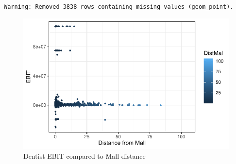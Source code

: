 \documentclass[
  10,
  a4paper,
]{article}
\begin{document}
\begin{verbatim}
Warning: Removed 3838 rows containing missing values (geom_point).
\end{verbatim}

\begin{figure}

{\centering \includegraphics{Retail-Agglomeration_abstract_introduction_theori_econometric_approach_files/figure-pdf/fig-4-1.pdf}

}

\caption{\label{fig-4}Dentist EBIT compared to Mall distance}

\end{figure}
\end{document}
